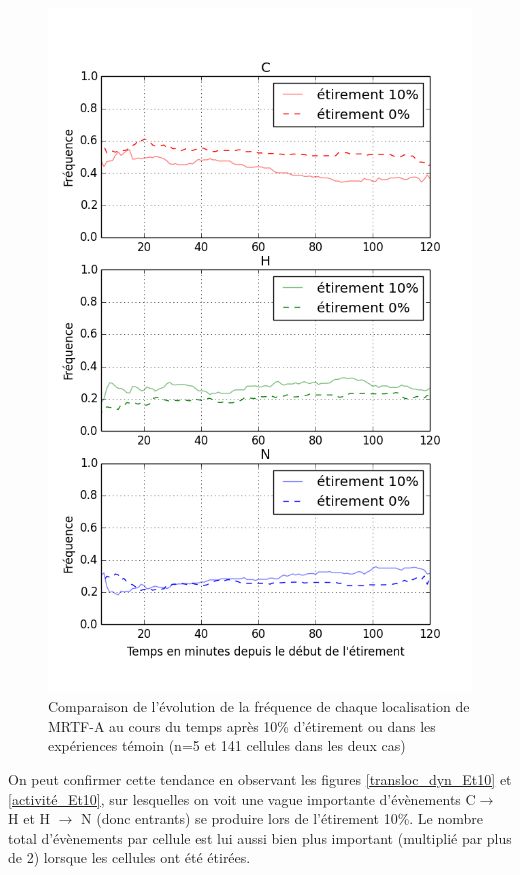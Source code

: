 \documentclass{report}
\begin{document}
\begin{figure}
\includegraphics[scale=0.4]{Figures/Etirement10_vs_0_dynamique.png} 
\caption{\label{CHN_dyn_Et10} Comparaison de l'évolution de la fréquence de chaque localisation de MRTF-A au cours du temps après 10\% d'étirement ou dans les expériences témoin (n=5 et 141 cellules dans les deux cas)}
\end{figure}

On peut confirmer cette tendance en observant les figures \ref{transloc_dyn_Et10} et \ref{activité_Et10}, sur lesquelles on voit une vague importante d'évènements C$\rightarrow$ H et H $\rightarrow$ N (donc entrants) se produire lors de l'étirement 10\%. Le nombre total d'évènements par cellule est lui aussi bien plus important (multiplié par plus de 2) lorsque les cellules ont été étirées. 
\end{document}

